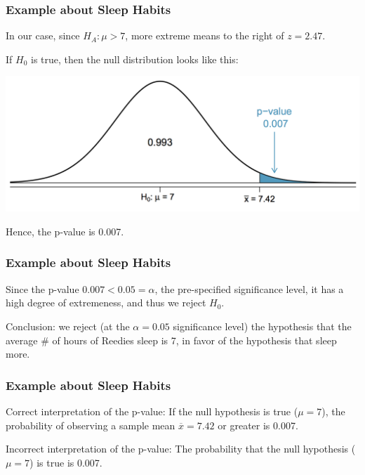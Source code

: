 \documentclass[slides]{beamer}
\newcommand{\blue}[1]{\textcolor{blue2}{#1}}
\newcommand{\xbar}{\overline{x}}
\begin{document}
\begin{frame}
\frametitle{Example about Sleep Habits}

%
%
In our case, since $H_A: \mu > 7$, \blue{more extreme} means \blue{to the right} of $z=2.47$.  

\vspace{0.5cm}

If $H_0$ is true, then the \blue{null distribution} looks like this:  

\begin{center}
\includegraphics[width=\textwidth]{figure/pvalue.png}
\end{center}

Hence, the p-value is 0.007.
\end{frame}


\begin{frame}
\frametitle{Example about Sleep Habits}
Since the p-value $0.007 < 0.05=\alpha$, the pre-specified significance level, it has a high degree of extremeness, and thus we reject $H_0$.

\vspace{0.5cm}

\pause\blue{Conclusion}: we reject (at the $\alpha=0.05$ significance level) the hypothesis that the average \# of hours of Reedies sleep is 7, in favor of the hypothesis that sleep more.    

\end{frame}


\begin{frame}
\frametitle{Example about Sleep Habits}
\blue{Correct interpretation of the p-value}:  If the null hypothesis is true ($\mu=7$), the probability of observing a sample mean $\xbar=7.42$ or greater is 0.007.  

\vspace{0.5cm}

\pause \blue{Incorrect interpretation of the p-value}:  The probability that the null hypothesis ($\mu=7$) is true is 0.007.  

\end{frame}
\end{document}
